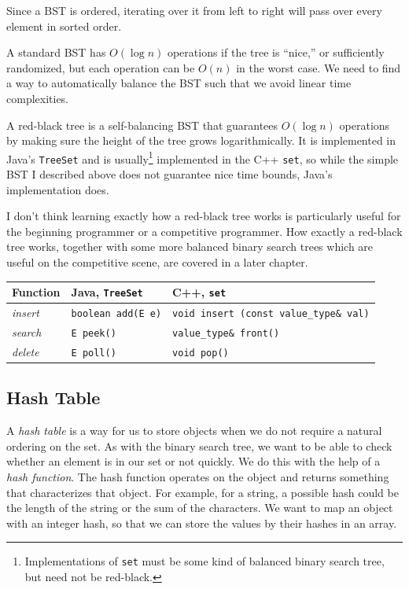 Since a BST is ordered, iterating over it from left to right will pass over every element in sorted order.

A standard BST has $O(\log{n})$ operations if the tree is ``nice,'' or sufficiently randomized, but each operation can be $O(n)$ in the worst case. We need to find a way to automatically balance the BST such that we avoid linear time complexities.

A red-black tree is a self-balancing BST that guarantees $O(\log{n})$ operations by making sure the height of the tree grows logarithmically. It is implemented in Java's \texttt{TreeSet} and is usually\footnote{Implementations of \texttt{set} must be some kind of balanced binary search tree, but need not be red-black.} implemented in the C++ \texttt{set}, so while the simple BST I described above does not guarantee nice time bounds, Java's implementation does.

I don't think learning exactly how a red-black tree works is particularly useful for the beginning programmer or a competitive programmer. How exactly a red-black tree works, together with some more balanced binary search trees which are useful on the competitive scene, are covered in a later chapter.

\begin{center}
    \begin{tabular}{ p{5cm} p{5cm} p{5cm} }
	Function	&	Java, \texttt{TreeSet}	&	C++, \texttt{set} \\
	\hline
	\textit{insert}		&	\texttt{boolean add(E e)}	&	\texttt{void insert (const value\_type\& val)} \\
   \textit{search}		&	\texttt{E peek()}		&	\texttt{value\_type\& front()}	\\
    \textit{delete}		&	\texttt{E poll()}		&	\texttt{void pop()}
    \end{tabular}
\end{center}

\subsection{Hash Table}

A \textit{hash table} is a way for us to store objects when we do not require a natural ordering on the set. As with the binary search tree, we want to be able to check whether an element is in our set or not quickly. We do this with the help of a \textit{hash function}. The hash function operates on the object and returns something that characterizes that object. For example, for a string, a possible hash could be the length of the string or the sum of the characters. We want to map an object with an integer hash, so that we can store the values by their hashes in an array.

